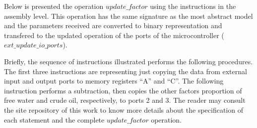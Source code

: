 \documentclass[11pt]{article} %
\begin{document}

Below is presented the operation $\mathit{update\_factor}$ using the instructions
in the assembly level. This operation has the same signature as the most
abstract model and the parameters received are converted to binary representation and
transfered to the updated operation of the ports of the microcontroller
($\mathit{ext\_update\_io\_ports}$).

Briefly, the sequence of instructions illustrated performs the following
procedures. The first three instructions are representing just copying the data
from external input and output ports to memory registers ``A'' and ``C''. The
following instruction performs a subtraction, then copies the other factors
proportion of free water and crude oil, respectively, to ports 2 and 3. The
reader may consult the site repository of this work to know more details about the
specification of each statement and the complete $\mathit{update\_factor}$
operation.
   
\end{document}
